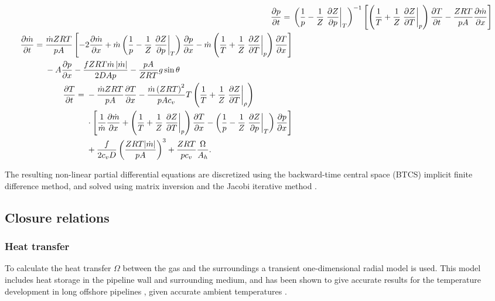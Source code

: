 {\allowdisplaybreaks %
\begin{align}
    \pdt{p} ={}& 
    \del{\frac{1}{p} - \frac{1}{Z} \eval{\dpd{Z}{p}}_T}^{-1}
    \sbr{
    \del{\frac{1}{T} + \frac{1}{Z}\eval{\dpd{Z}{T}}_p} \dpd{T}{t}
    - \frac{ZRT}{pA}\dpd{\dot m}{x}
    }
\label{eq:continuityEquation}
    \\
    \begin{split}
        \pdt{\dot m} ={}& \frac{\dot m ZRT}{pA} 
        \sbr{
            - 2\pdx{\dot m}
            + \dot m \del{\frac{1}{p} - \frac{1}{Z} \eval{\dpd{Z}{p}}_T} \pdx{p}
            - \dot m \del{\frac{1}{T} + \frac{1}{Z} \eval{\dpd{Z}{T}}_p} \pdx{T}
        }
        \\&
        {}- A\pdx{p}
        - \frac{fZRT \dot m \abs{\dot m}}{2DAp}
        - \frac{pA}{ZRT}g\sin\theta
    \end{split}
\label{eq:momentumEquation}
    \\
    \begin{split}
        \pdt{T} ={}&
        - \frac{\dot m ZRT}{pA}\pdx{T}
        - \frac{\dot m \del{ZRT}^2}{pAc_v}T \del{\frac{1}{T} + \frac{1}{Z}\eval{\dpd{Z}{T}}_\rho} \\
        &{}\times 
        \sbr{
            \frac{1}{\dot m}\dpd{\dot m}{x} 
            + \del{\frac{1}{T} + \frac{1}{Z}\eval{\dpd{Z}{T}}_p}\pdx{T}
            - \del{\frac{1}{p} - \frac{1}{Z}\eval{\dpd{Z}{p}}_T}\pdx{p}
        } \\
        &{}+ \frac{f}{2c_vD}\del{\frac{ZRT|\dot m|}{pA}}^3 
        + \frac{ZRT}{p c_v} \frac{\Omega}{A_h}
        .
    \end{split}
\label{eq:energyEquation}
\end{align}
}

The resulting non-linear partial differential equations are discretized using the backward-time central space (BTCS) implicit finite difference method, and solved using matrix inversion and the Jacobi iterative method \cite{Ferziger2002Computational}.

\subsection{Closure relations}
\subsubsection{Heat transfer}
To calculate the heat transfer $\Omega$ between the gas and the surroundings a transient one-dimensional radial model \cite{Chaczykowski2010Transient} is used. This model includes heat storage in the pipeline wall and surrounding medium, and has been shown to give accurate results for the temperature development in long offshore pipelines \cite{Helgaker2014Validation,Oosterkamp2015Modelling,Oosterkamp2016Heat}, given accurate ambient temperatures \cite{Sund2015Pipeline}.

